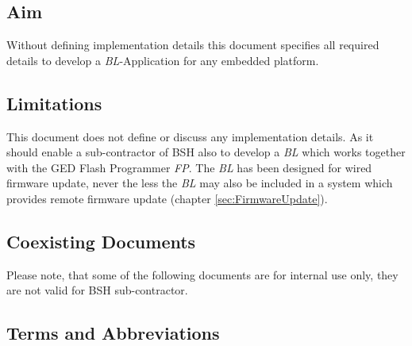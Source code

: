 \documentclass[a4paper,british,oneside,12pt]{scrartcl}
\newcommand{\bl}{\emph{BL}}
\newcommand{\fp}{\emph{FP}}
\begin{document}
\subsection{Aim}
Without defining implementation details this document specifies all required details to develop a \bl{}-App\-li\-ca\-tion for any embedded platform.

\subsection{Limitations}
This document does not define or discuss any implementation details. As it should enable a sub-contractor of BSH also to develop a \bl{} which works together with the GED Flash Programmer \fp{}. The \bl{} has been designed for wired firmware update, never the less the \bl{} may also be included in a system which provides remote firmware update (chapter \ref{sec:FirmwareUpdate}).

\newpage
\subsection{Coexisting Documents}
Please note, that some of the following documents are for internal use only, they are not valid for BSH sub-contractor.\\



\subsection{Terms and Abbreviations}
\end{document}
